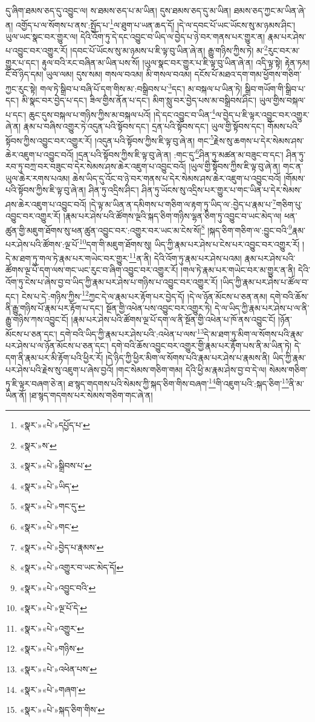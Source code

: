 དུ་ཞིག་ཐམས་ཅད་དུ་འབྱུང་ལ། ས་ཐམས་ཅད་པ་མ་ཡིན། དུས་ཐམས་ཅད་དུ་མ་ཡིན། ཐམས་ཅད་ཀྱང་མ་ཡིན་ཞེ་ན། འགྱོད་པ་ལ་སོགས་པ་ནས་:སྤྱོད་པ་\footnote{«སྣར་»«པེ་»དཔྱོད་པ་}ལ་ཐུག་པ་ཡན་ཆད་དོ། །དེ་ལ་དབང་པོ་ཡང་ཡོངས་སུ་མ་ཉམས་ཤིང་། ཡུལ་ཡང་སྣང་བར་གྱུར་ལ། དེའི་འོག་ཏུ་དེ་དང་འབྱུང་བ་ཡིད་ལ་བྱེད་པ་ཉེ་བར་གནས་པར་གྱུར་ན། རྣམ་པར་ཤེས་པ་འབྱུང་བར་འགྱུར་རོ། །དབང་པོ་ཡོངས་སུ་མ་ཉམས་པ་ཇི་ལྟ་བུ་ཡིན་ཞེ་ན། རྒྱུ་གཉིས་ཀྱིས་ཏེ། མ་\footnote{«སྣར་»ས་}རུང་བར་མ་གྱུར་པ་དང་། རྟུལ་བའི་རང་བཞིན་མ་ཡིན་པས་སོ། །ཡུལ་སྣང་བར་གྱུར་པ་ཇི་ལྟ་བུ་ཡིན་ཞེ་ན། འདི་ལྟ་སྟེ། རྟེན་ཏམ། ངོ་བོ་ཉིད་དམ། ཡུལ་ལམ། དུས་སམ། གསལ་བའམ། མི་གསལ་བའམ། དངོས་པོ་མཐའ་དག་གམ་ཕྱོགས་གཅིག་ཀྱང་རུང་སྟེ། གལ་ཏེ་སྒྲིབ་པ་བཞི་པོ་དག་གིས་མ་:བསྒྲིབས་པ་\footnote{«སྣར་»«པེ་»སྒྲིབས་པ་}དང་། མ་བསྐལ་པ་ཡིན་ཏེ། སྒྲིབ་གཡོག་གི་སྒྲིབ་པ་དང་། མི་སྣང་བར་བྱེད་པ་དང་། ཟིལ་གྱིས་ནོན་པ་དང་། མིག་སླུ་བར་བྱེད་པས་མ་བསྒྲིབས་ཤིང་། ཡུལ་གྱིས་བསྐལ་པ་དང་། ཆུང་དུས་བསྐལ་པ་གཉིས་ཀྱིས་མ་བསྐལ་པའོ། །དེ་དང་འབྱུང་བ་ཡིན་\footnote{«སྣར་»«པེ་»ཡིད་}ལ་བྱེད་པ་ཇི་ལྟར་འབྱུང་བར་འགྱུར་ཞེ་ན། རྣམ་པ་བཞིས་འགྱུར་ཏེ་འདུན་པའི་སྟོབས་དང་། དྲན་པའི་སྟོབས་དང་། ཡུལ་གྱི་སྟོབས་དང་། གོམས་པའི་སྟོབས་ཀྱིས་འབྱུང་བར་འགྱུར་རོ། །འདུན་པའི་སྟོབས་ཀྱིས་ཇི་ལྟ་བུ་ཞེ་ན། གང་\footnote{«སྣར་»«པེ་»གང་དུ་}རྗེས་སུ་ཆགས་པ་དེར་སེམས་ཤས་ཆེར་འཇུག་པ་འབྱུང་བའོ། །དྲན་པའི་སྟོབས་ཀྱིས་ཇི་ལྟ་བུ་ཞེ་ན། :གང་དུ་\footnote{«སྣར་»«པེ་»གང་}ཤིན་ཏུ་མཚན་མ་བཟུང་བ་དང་། ཤིན་ཏུ་རབ་ཏུ་བཀྲ་བར་བཟུང་བ་དེར་སེམས་ཤས་ཆེར་འཇུག་པ་འབྱུང་བའོ། །ཡུལ་གྱི་སྟོབས་ཀྱིས་ཇི་ལྟ་བུ་ཞེ་ན། གང་ན་ཡུལ་ཆེར་རགས་པའམ། ཆེས་ཡིད་དུ་འོང་བ་ཉེ་བར་གནས་པ་དེར་སེམས་ཤས་ཆེར་འཇུག་པ་འབྱུང་བའོ། །གོམས་པའི་སྟོབས་ཀྱིས་ཇི་ལྟ་བུ་ཞེ་ན། ཤིན་ཏུ་འདྲིས་ཤིང་། ཤིན་ཏུ་ཡོངས་སུ་འདྲིས་པར་གྱུར་པ་གང་ཡིན་པ་དེར་སེམས་ཤས་ཆེར་འཇུག་པ་འབྱུང་བའོ། །དེ་ལྟ་མ་ཡིན་ན་དམིགས་པ་གཅིག་ལ་རྟག་ཏུ་ཡིད་ལ་:བྱེད་པ་རྣམ་པ་\footnote{«སྣར་»«པེ་»བྱེད་པ་རྣམས་}གཅིག་པུ་འབྱུང་བར་འགྱུར་རོ། །རྣམ་པར་ཤེས་པའི་ཚོགས་ལྔའི་སྐད་ཅིག་གཉིས་ལྷན་ཅིག་ཏུ་འབྱུང་བ་ཡང་མེད་ལ། ཕན་ཚུན་གྱི་མཇུག་ཐོགས་སུ་ཕན་ཚུན་འབྱུང་བར་:འགྱུར་བར་ཡང་མ་ངེས་སོ།\footnote{«སྣར་»«པེ་»འགྱུར་བ་ཡང་མེད་དོ།} །སྐད་ཅིག་གཅིག་ལ་:བྱུང་བའི་\footnote{«སྣར་»«པེ་»འབྱུང་བའི་}རྣམ་པར་ཤེས་པའི་ཚོགས་:ལྔ་པོ་\footnote{«སྣར་»«པེ་»ལྔ་པོ་དེ་}དག་གི་མཇུག་ཐོགས་སུ། ཡིད་ཀྱི་རྣམ་པར་ཤེས་པ་ངེས་པར་འབྱུང་བར་འགྱུར་རོ། །དེ་མ་ཐག་ཏུ་གལ་ཏེ་རྣམ་པར་གཡེང་བར་གྱུར་\footnote{«སྣར་»«པེ་»འགྱུར་}ན་ནི། དེའི་འོག་ཏུ་རྣམ་པར་ཤེས་པའམ། རྣམ་པར་ཤེས་པའི་ཚོགས་ལྔ་པོ་དག་ལས་གང་ཡང་རུང་བ་ཞིག་འབྱུང་བར་འགྱུར་རོ། །གལ་ཏེ་རྣམ་པར་གཡེང་བར་མ་གྱུར་ན་ནི། དེའི་འོག་ཏུ་ངེས་པ་ཞེས་བྱ་བ་ཡིད་ཀྱི་རྣམ་པར་ཤེས་པ་གཉིས་པ་འབྱུང་བར་འགྱུར་རོ། །ཡིད་ཀྱི་རྣམ་པར་ཤེས་པ་ཚོལ་བ་དང་། ངེས་པ་དེ་:གཉིས་ཀྱིས་\footnote{«སྣར་»«པེ་»གཉིས་}ཀྱང་དེ་ལ་རྣམ་པར་རྟོག་པར་བྱེད་དོ། །དེ་ལ་ཉོན་མོངས་པ་ཅན་ནམ། དགེ་བའི་ཆོས་ནི་རྒྱུ་གཉིས་པོ་རྣམ་པར་རྟོག་པ་དང་། སྔོན་གྱི་འཕེན་པས་འབྱུང་བར་འགྱུར་ཏེ། དེ་ལ་ཡིད་ཀྱི་རྣམ་པར་ཤེས་པ་ལ་ནི་རྒྱུ་གཉིས་ཀས་འབྱུང་ངོ། །རྣམ་པར་ཤེས་པའི་ཚོགས་ལྔ་པོ་དག་ལ་ནི་སྔོན་གྱི་འཕེན་པ་ཁོ་ནས་འབྱུང་ངོ། །ཉོན་མོངས་པ་ཅན་དང་། དགེ་བའི་ཡིད་ཀྱི་རྣམ་པར་ཤེས་པའི་:འཕེན་པ་ལས་\footnote{«སྣར་»«པེ་»འཕེན་པས་}དེ་མ་ཐག་ཏུ་མིག་ལ་སོགས་པའི་རྣམ་པར་ཤེས་པ་ལ་ཉོན་མོངས་པ་ཅན་དང་། དགེ་བའི་ཆོས་འབྱུང་བར་འགྱུར་གྱི་རྣམ་པར་རྟོག་པས་ནི་མ་ཡིན་ཏེ། དེ་དག་ནི་རྣམ་པར་མི་རྟོག་པའི་ཕྱིར་རོ། །དེ་ཉིད་ཀྱི་ཕྱིར་མིག་ལ་སོགས་པའི་རྣམ་པར་ཤེས་པ་རྣམས་ནི། ཡིད་ཀྱི་རྣམ་པར་ཤེས་པའི་རྗེས་སུ་འཇུག་པ་ཞེས་བྱའོ། །གང་སེམས་གཅིག་གམ། དེའི་ཕྱི་མ་རྣམ་ཤེས་བྱ་བ་དེ་ལ། སེམས་གཅིག་ཏུ་ཇི་ལྟར་བཞག་ཅེ་ན། ཐ་སྙད་གདགས་པའི་སེམས་ཀྱི་སྐད་ཅིག་གིས་བཞག་\footnote{«སྣར་»«པེ་»གཞག་}གི་འཇུག་པའི་:སྐད་ཅིག་\footnote{«སྣར་»«པེ་»སྐད་ཅིག་གིས་}ནི་མ་ཡིན་ནོ། །ཐ་སྙད་གདགས་པར་སེམས་གཅིག་གང་ཞེ་ན། 